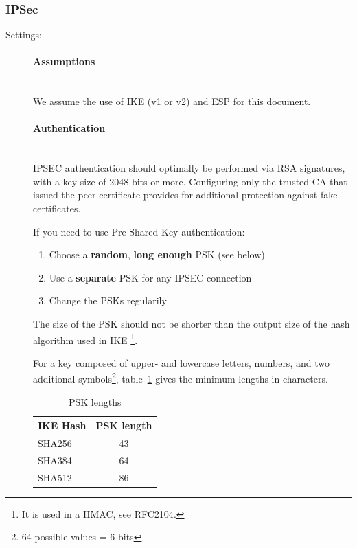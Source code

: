 \subsubsection{IPSec}
\label{section:IPSECgeneral}

\begin{description}

\item[Settings:] \mbox{}

\paragraph*{Assumptions}\mbox{}\\

We assume the use of IKE (v1 or v2) and ESP for this document.

\paragraph*{Authentication}\mbox{}\\

IPSEC authentication should optimally be performed via RSA signatures,
with a key size of 2048 bits or more. Configuring only the trusted CA
that issued the peer certificate provides for additional protection
against fake certificates.

If you need to use Pre-Shared Key authentication:

\begin{enumerate}
\item Choose a \textbf{random}, \textbf{long enough} PSK (see below)
\item Use a \textbf{separate} PSK for any IPSEC connection
\item Change the PSKs regularily
\end{enumerate}

The size of the PSK should not be shorter than the output size of
the hash algorithm used in IKE \footnote{It is used in a HMAC, see
RFC2104\cite{rfc2104}.}.

For a key composed of upper- and lowercase letters, numbers, and two
additional symbols\footnote{64 possible values = 6 bits},
table~\ref{tab:IPSEC_psk_len} gives the minimum lengths in characters.

\begin{table}[h]
  \centering
  \small
  \begin{tabular}{lc}
    \toprule
    IKE Hash & PSK length \\
    \midrule
    SHA256 & 43 \\
    SHA384 & 64 \\
    SHA512 & 86 \\
    \bottomrule
  \end{tabular}
  \caption{PSK lengths}
  \label{tab:IPSEC_psk_len}
\end{table}


\end{description}
